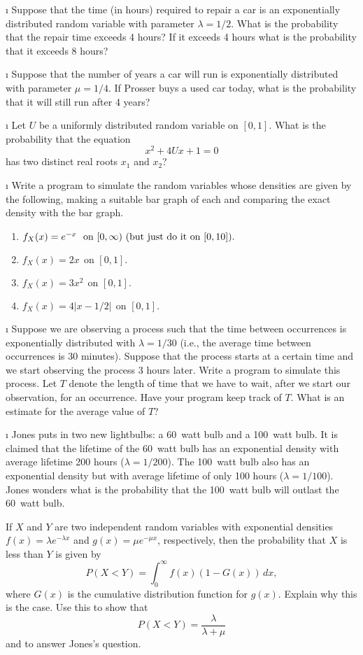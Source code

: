 \begin{LJSItem}
\i\label{5.2.28} Suppose that the time (in hours) required to repair a car is an
exponentially distributed random variable with parameter $\lambda = 1/2$.  What is the
probability that the repair time exceeds 4 hours?  If it exceeds 4 hours what is the
probability that it exceeds 8 hours?

\i\label{5.2.29} Suppose that the number of years a car will run is exponentially
distributed with parameter $\mu = 1/4$.  If Prosser buys a used car today, what is the
probability that it will still run after 4 years?

\i\label{5.2.30} Let $U$ be a uniformly distributed random variable on $[0,1]$. 
What is the probability that the equation
$$ x^2 + 4Ux + 1 = 0
$$ has two distinct real roots $x_1$ and $x_2$?

\i\label{exer 5.2.31} Write a program to simulate the random variables whose
densities are given by the following, making a suitable bar graph of each and
comparing the exact density with the bar graph.

\begin{enumerate}
\item $f_X(x) = e^{-x}\ \  \mbox{on}\,\, [0,\infty)\,\, 
(\mbox{but\,\,just\,\,do\,\,it\,\,on\,\,} [0,10]).$

\item $f_X(x) = 2x\ \ \mbox{on}\,\, [0,1].$

\item $f_X(x) = 3x^2\ \ \mbox{on}\,\, [0,1].$

\item $f_X(x) = 4|x - 1/2|\ \ \mbox{on}\,\, [0,1].$
\end{enumerate}

\i\label{exer 5.2.32} Suppose we are observing a process such that the time
between occurrences is exponentially distributed with $\lambda = 1/30$ (i.e., 
the average time between occurrences is 30 minutes).  Suppose that the 
process starts at a certain time and we start observing the process 3 hours 
later.  Write a program to simulate this process.  Let $T$ denote the length 
of time that we have to wait, after we start our observation, for an occurrence.  
Have your program keep track of $T$.  What is an estimate for the average value of $T$? 

\i\label{exer 5.2.33} Jones puts in two new lightbulbs: a 60~watt bulb and a
100~watt bulb.  It is claimed that the lifetime of the 60~watt bulb has an exponential
density with average lifetime 200 hours ($\lambda = 1/200$).  The 100~watt
bulb also has an exponential density but with average lifetime of only 100 hours
($\lambda = 1/100$).  Jones wonders what is the probability that the 100~watt bulb will
outlast the 60~watt bulb.
\par
If $X$ and $Y$ are two independent random variables with exponential densities
$f(x) = \lambda e^{-\lambda x}$ and $g(x) = \mu e^{-\mu x}$, respectively, then the
probability that
$X$ is less than $Y$ is given by
$$ P(X < Y) = \int_0^\infty f(x)(1 - G(x))\,dx,
$$ where $G(x)$ is the cumulative distribution function for $g(x)$.  Explain why this is the
case.  Use this to show that
$$ P(X < Y) = \frac \lambda{\lambda + \mu}
$$ and to answer Jones's question. 


\end{LJSItem}
